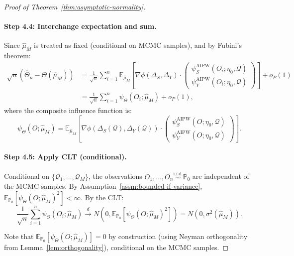 \begin{proof}[Proof of Theorem~\ref{thm:asymptotic-normality}]
\paragraph{Step 4.4: Interchange expectation and sum.}
Since $\hat{\mu}_M$ is treated as fixed (conditional on MCMC samples), and by Fubini's theorem:
\begin{align}
\sqrt{n}(\hat{\Theta}_n - \Theta(\hat{\mu}_M)) &= \frac{1}{\sqrt{n}}\sum_{i=1}^n \mathbb{E}_{\hat{\mu}_M}\left[\nabla\phi(\Delta_S, \Delta_Y) \cdot \begin{pmatrix} \psi_S^{\text{AIPW}}(O_i; \eta_0, \mathcal{Q}) \\ \psi_Y^{\text{AIPW}}(O_i; \eta_0, \mathcal{Q}) \end{pmatrix}\right] + o_P(1) \\
&= \frac{1}{\sqrt{n}}\sum_{i=1}^n \psi_\Theta(O_i; \hat{\mu}_M) + o_P(1),
\end{align}
where the composite influence function is:
\begin{equation}
\psi_\Theta(O; \hat{\mu}_M) = \mathbb{E}_{\hat{\mu}_M}\left[\nabla\phi(\Delta_S(\mathcal{Q}), \Delta_Y(\mathcal{Q})) \cdot \begin{pmatrix} \psi_S^{\text{AIPW}}(O; \eta_0, \mathcal{Q}) \\ \psi_Y^{\text{AIPW}}(O; \eta_0, \mathcal{Q}) \end{pmatrix}\right].
\end{equation}

\paragraph{Step 4.5: Apply CLT (conditional).}
Conditional on $\{\mathcal{Q}_1, \ldots, \mathcal{Q}_M\}$, the observations $O_1, \ldots, O_n \overset{\text{i.i.d.}}{\sim} \mathbb{P}_0$ are independent of the MCMC samples. By Assumption~\ref{assm:bounded-if-variance}, $\mathbb{E}_{\mathbb{P}_0}[\psi_\Theta(O; \hat{\mu}_M)^2] < \infty$. By the CLT:
\begin{equation}
\frac{1}{\sqrt{n}}\sum_{i=1}^n \psi_\Theta(O_i; \hat{\mu}_M) \xrightarrow{d} N(0, \mathbb{E}_{\mathbb{P}_0}[\psi_\Theta(O; \hat{\mu}_M)^2]) = N(0, \sigma^2(\hat{\mu}_M)).
\end{equation}

Note that $\mathbb{E}_{\mathbb{P}_0}[\psi_\Theta(O; \hat{\mu}_M)] = 0$ by construction (using Neyman orthogonality from Lemma~\ref{lem:orthogonality}), conditional on the MCMC samples.


\end{proof}
